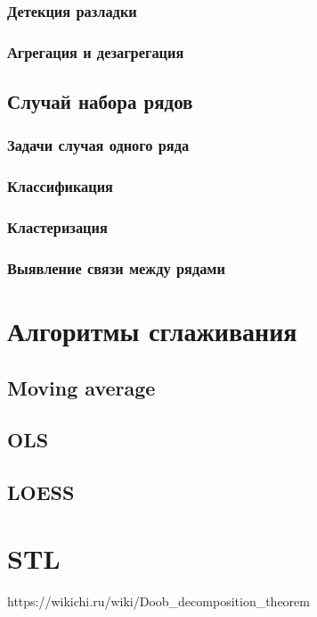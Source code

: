 \documentclass[12pt,fleqn]{article}
\begin{document}
\subsubsection{Детекция разладки}

\subsubsection{Агрегация и дезагрегация}

\subsection{Случай набора рядов}

\subsubsection{Задачи случая одного ряда}

\subsubsection{Классификация}

\subsubsection{Кластеризация}

\subsubsection{Выявление связи между рядами}

\section{Алгоритмы сглаживания}

\subsection{Moving average}

\subsection{OLS}

\subsection{LOESS}

\section{STL}

\begin{thebibliography}{1}
	https://wikichi.ru/wiki/Doob\_decomposition\_theorem
\end{thebibliography}
\end{document}

